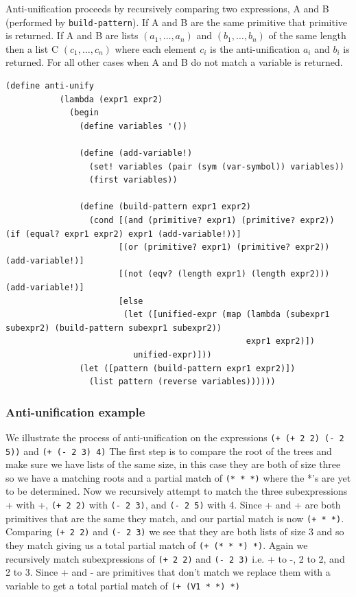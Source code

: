 \documentclass[a4paper,10pt]{article}
\begin{document}
Anti-unification proceeds by recursively comparing two expressions, A and B (performed by \texttt{build-pattern}).  If A and B are the same primitive that primitive is returned.  If A and B are lists $(a_1,\ldots,a_n)$ and $(b_1,\ldots,b_n)$ of the same length then a list C $(c_1,\ldots,c_n)$ where each element $c_i$ is the anti-unification $a_i$ and $b_i$ is returned.  For all other cases when A and B do not match a variable is returned.

\begin{lstlisting}[frame=trBL]
(define anti-unify
           (lambda (expr1 expr2)
             (begin
               (define variables '())

               (define (add-variable!)
                 (set! variables (pair (sym (var-symbol)) variables))
                 (first variables))
               
               (define (build-pattern expr1 expr2)
                 (cond [(and (primitive? expr1) (primitive? expr2)) (if (equal? expr1 expr2) expr1 (add-variable!))]
                       [(or (primitive? expr1) (primitive? expr2)) (add-variable!)]
                       [(not (eqv? (length expr1) (length expr2))) (add-variable!)]
                       [else
                        (let ([unified-expr (map (lambda (subexpr1 subexpr2) (build-pattern subexpr1 subexpr2))
                                                 expr1 expr2)])
                          unified-expr)]))
               (let ([pattern (build-pattern expr1 expr2)])
                 (list pattern (reverse variables))))))
\end{lstlisting}

\subsubsection{Anti-unification example}
We illustrate the process of anti-unification on the expressions \texttt{(+ (+ 2 2) (- 2 5))} and \texttt{(+ (- 2 3) 4)}
The first step is to compare the root of the trees and make sure we have lists of the same size, in this case they are both of size three so we have a matching roots and a partial match of \texttt{(* * *)} where the *'s are yet to be determined.
Now we recursively attempt to match the three subexpressions + with +, \texttt{(+ 2 2)} with \texttt{(- 2 3)}, and \texttt{(- 2 5)} with 4.
Since + and + are both primitives that are the same they match, and our partial match is now \texttt{(+ * *)}.
Comparing \texttt{(+ 2 2)} and \texttt{(- 2 3)} we see that they are both lists of size 3 and so they match giving us a total partial match of \texttt{(+ (* * *) *)}.
Again we recursively match subexpressions of \texttt{(+ 2 2)} and \texttt{(- 2 3)} i.e. + to -, 2 to 2, and 2 to 3.
Since + and - are primitives that don't match we replace them with a variable to get a total partial match of \texttt{(+ (V1 * *) *)}
\end{document}
